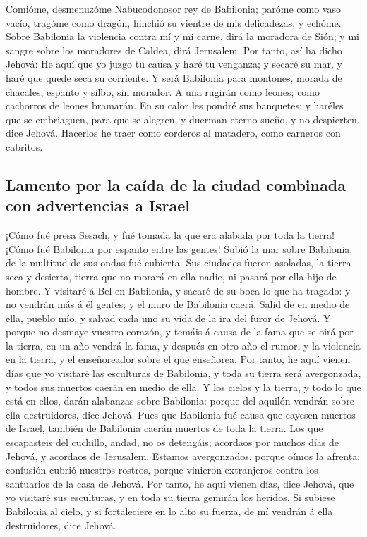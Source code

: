  Comióme, desmenuzóme Nabucodonosor rey de Babilonia;
paróme como vaso vacío, tragóme como dragón, hinchió su vientre de mis
delicadezas, y echóme.  Sobre Babilonia la violencia
contra mí y mi carne, dirá la moradora de Sión; y mi sangre sobre los
moradores de Caldea, dirá Jerusalem.  Por tanto, así ha
dicho Jehová: He aquí que yo juzgo tu causa y haré tu venganza; y secaré
su mar, y haré que quede seca su corriente.  Y será
Babilonia para montones, morada de chacales, espanto y silbo, sin
morador.  A una rugirán como leones; como cachorros de
leones bramarán.  En su calor les pondré sus banquetes; y
haréles que se embriaguen, para que se alegren, y duerman eterno sueño,
y no despierten, dice Jehová.  Hacerlos he traer como
corderos al matadero, como carneros con cabritos.

\hypertarget{lamento-por-la-cauxedda-de-la-ciudad-combinada-con-advertencias-a-israel}{%
\subsection{Lamento por la caída de la ciudad combinada con advertencias
a
Israel}\label{lamento-por-la-cauxedda-de-la-ciudad-combinada-con-advertencias-a-israel}}

 ¡Cómo fué presa Sesach, y fué tomada la que era alabada
por toda la tierra! ¡Cómo fué Babilonia por espanto entre las gentes!
 Subió la mar sobre Babilonia; de la multitud de sus
ondas fué cubierta.  Sus ciudades fueron asoladas, la
tierra seca y desierta, tierra que no morará en ella nadie, ni pasará
por ella hijo de hombre.  Y visitaré á Bel en Babilonia,
y sacaré de su boca lo que ha tragado: y no vendrán más á él gentes; y
el muro de Babilonia caerá.  Salid de en medio de ella,
pueblo mío, y salvad cada uno su vida de la ira del furor de Jehová.
 Y porque no desmaye vuestro corazón, y temáis á causa de
la fama que se oirá por la tierra, en un año vendrá la fama, y después
en otro año el rumor, y la violencia en la tierra, y el enseñoreador
sobre el que enseñorea.  Por tanto, he aquí vienen días
que yo visitaré las esculturas de Babilonia, y toda su tierra será
avergonzada, y todos sus muertos caerán en medio de ella.
 Y los cielos y la tierra, y todo lo que está en ellos,
darán alabanzas sobre Babilonia: porque del aquilón vendrán sobre ella
destruidores, dice Jehová.  Pues que Babilonia fué causa
que cayesen muertos de Israel, también de Babilonia caerán muertos de
toda la tierra.  Los que escapasteis del cuchillo, andad,
no os detengáis; acordaos por muchos días de Jehová, y acordaos de
Jerusalem.  Estamos avergonzados, porque oímos la
afrenta: confusión cubrió nuestros rostros, porque vinieron extranjeros
contra los santuarios de la casa de Jehová.  Por tanto,
he aquí vienen días, dice Jehová, que yo visitaré sus esculturas, y en
toda su tierra gemirán los heridos.  Si subiese Babilonia
al cielo, y si fortaleciere en lo alto su fuerza, de mí vendrán á ella
destruidores, dice Jehová.

